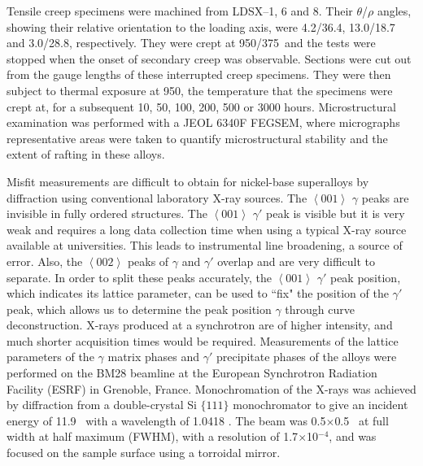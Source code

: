 Tensile creep specimens were machined from LDSX--1, 6 and 8.  Their $\theta$/$\rho$ angles, showing their relative orientation to the loading axis, were 4.2/36.4, 13.0/18.7 and 3.0/28.8, respectively.  They were crept at 950\celsius/375\mega\pascal\ and the tests were stopped when the onset of secondary creep was observable.  Sections were cut out from the gauge lengths of these interrupted creep specimens.  They were then subject to thermal exposure at 950\celsius, the temperature that the specimens were crept at, for a subsequent 10, 50, 100, 200, 500 or 3000 hours.  Microstructural examination was performed with a JEOL 6340F FEGSEM, where micrographs representative areas were taken to quantify microstructural stability and the extent of rafting in these alloys. 

Misfit measurements are difficult to obtain for nickel-base superalloys by diffraction using conventional laboratory X-ray sources.  The $\left<001\right>$ $\gamma$ peaks are invisible in fully ordered structures.  The $\left<001\right>$ $\gamma'$ peak is visible but it is very weak and requires a long data collection time when using a typical X-ray source available at universities.  This leads to instrumental line broadening, a source of error.  Also, the $\left<002\right>$ peaks of $\gamma$ and $\gamma'$ overlap and are very difficult to separate.  In order to split these peaks accurately, the $\left<001\right>$ $\gamma'$ peak position, which indicates its lattice parameter, can be used to ``fix" the position of the $\gamma'$ peak, which allows us to determine the peak position $\gamma$ through curve deconstruction. X-rays produced at a synchrotron are of higher intensity, and much shorter acquisition times would be required.  Measurements of the lattice parameters of the $\gamma$ matrix phases and $\gamma'$ precipitate phases of the alloys were performed on the BM28 beamline at the European Synchrotron Radiation Facility (ESRF) in Grenoble, France.  Monochromation of the X-rays was achieved by diffraction from a double-crystal Si $\{111\}$ monochromator to give an incident energy of 11.9 \kilo\electronvolt\ with a wavelength of 1.0418 \angstrom.  The beam was 0.5$\times$0.5 \milli\meter\ at full width at half maximum (FWHM), with a resolution of 1.7$\times$10$^{-4}$, and was focused on the sample surface using a torroidal mirror.

